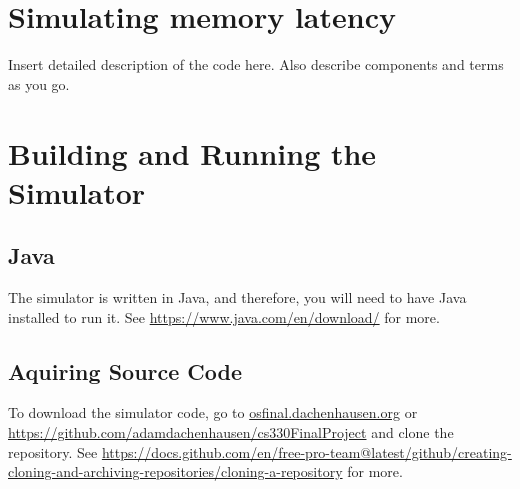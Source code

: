 \documentclass[12pt]{article}
\begin{document}
\section{Simulating memory latency}
\label{sec:memlate}

Insert detailed description of the code here. 
Also describe components and terms as you go. 

\section{Building and Running the Simulator}
\label{sec:build}

\subsection{Java}
The simulator is written in Java, and therefore, you will need to have
Java installed to run it. See \url{https://www.java.com/en/download/}
 for more.

\subsection{Aquiring Source Code}
To download the simulator code, go to \url{osfinal.dachenhausen.org} 
or
\url{https://github.com/adamdachenhausen/cs330FinalProject} 
and clone the repository. See \url{https://docs.github.com/en/free-pro-team@latest/github/creating-cloning-and-archiving-repositories/cloning-a-repository}
for more.
\end{document}
